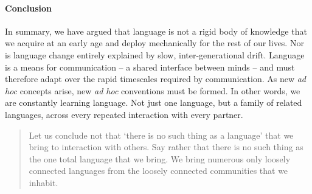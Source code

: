 %


\paragraph{Conclusion}

In summary, we have argued that language is not a rigid body of knowledge that we acquire at an early age and deploy mechanically for the rest of our lives. 
Nor is language change entirely explained by slow, inter-generational drift.
Language is a means for communication -- a shared interface between minds -- and must therefore adapt over the rapid timescales required by communication.
As new \emph{ad hoc} concepts arise, new \emph{ad hoc} conventions must be formed.
In other words, we are constantly learning language. 
Not just one language, but a family of related languages, across every repeated interaction with every partner. 

\begin{quote}
Let us conclude not that ‘there is no such thing as a language’ that we bring to interaction with others. Say rather that there is no such thing as the one total language that we bring. We bring numerous only loosely connected languages from the loosely connected communities that we inhabit. \cite{hacking1986nice}
\end{quote}
